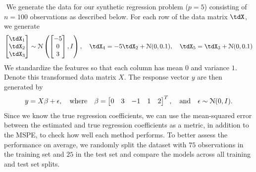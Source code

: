 $ $\newline
We generate the data for our synthetic regression problem ($p=5$) consisting of $n=100$ observations as described below. For each row of the data matrix $\tdX$, we generate
\[
\begin{bmatrix} \tdX_1 \\ \tdX_2 \\ \tdX_3 \end{bmatrix} \sim \distNorm \left( \begin{bmatrix} -5 \\ 0 \\ 3 \end{bmatrix}, I \right), \quad \tdX_4 = -5\tdX_2 + \distNorm(0, 0.1), \quad \tdX_5 = \tdX_3 + \distNorm(0, 0.1)
\]
We standardize the features so that each column has mean $0$ and variance $1$. Denote this transformed data matrix $X$. The response vector $y$ are then generated by
\[
y = X\beta + \epsilon, \quad \text{where} \quad \beta=\begin{bmatrix} 0 & 3 & -1 & 1 & 2 \end{bmatrix}^T, \quad \text{and} \quad \epsilon \sim \mathcal{N}(0, I).
\]
Since we know the true regression coefficients, we can use the mean-squared error between the estimated and true regression coefficients as a metric, in addition to the MSPE, to check how well each method performs. To better assess the performance on average, we randomly split the dataset with $75$ observations in the training set and $25$ in the test set and compare the models across all training and test set splits.

